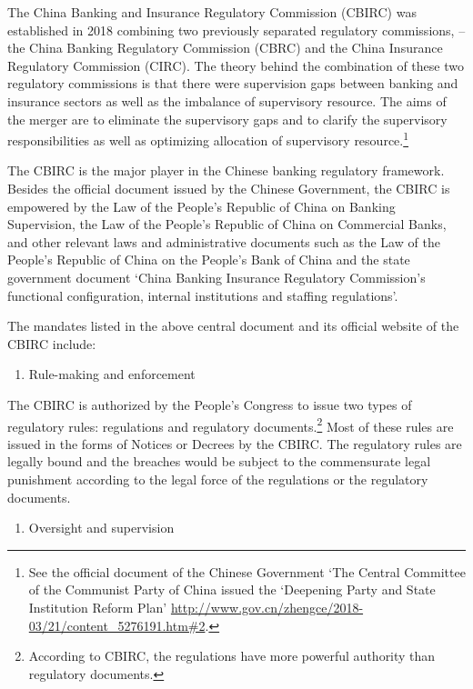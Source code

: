 \documentclass[
  letterpaper,
  DIV=11,
  numbers=noendperiod]{scrreprt}
\providecommand{\tightlist}{%
  \setlength{\itemsep}{0pt}\setlength{\parskip}{0pt}}\usepackage{longtable,booktabs,array}
\begin{document}
The China Banking and Insurance Regulatory Commission (CBIRC) was
established in 2018 combining two previously separated regulatory
commissions, -- the China Banking Regulatory Commission (CBRC) and the
China Insurance Regulatory Commission (CIRC). The theory behind the
combination of these two regulatory commissions is that there were
supervision gaps between banking and insurance sectors as well as the
imbalance of supervisory resource. The aims of the merger are to
eliminate the supervisory gaps and to clarify the supervisory
responsibilities as well as optimizing allocation of supervisory
resource.\footnote{See the official document of the Chinese Government
  `The Central Committee of the Communist Party of China issued the
  `Deepening Party and State Institution Reform Plan'
  \url{http://www.gov.cn/zhengce/2018-03/21/content_5276191.htm\#2}.}

The CBIRC is the major player in the Chinese banking regulatory
framework. Besides the official document issued by the Chinese
Government, the CBIRC is empowered by the Law of the People's Republic
of China on Banking Supervision, the Law of the People's Republic of
China on Commercial Banks, and other relevant laws and administrative
documents such as the Law of the People's Republic of China on the
People's Bank of China and the state government document `China Banking
Insurance Regulatory Commission's functional configuration, internal
institutions and staffing regulations'.

The mandates listed in the above central document and its official
website of the CBIRC include:

\begin{enumerate}
\def\labelenumi{\Roman{enumi})}
\tightlist
\item
  Rule-making and enforcement
\end{enumerate}

The CBIRC is authorized by the People's Congress to issue two types of
regulatory rules: regulations and regulatory documents.\footnote{According
  to CBIRC, the regulations have more powerful authority than regulatory
  documents.} Most of these rules are issued in the forms of Notices or
Decrees by the CBIRC. The regulatory rules are legally bound and the
breaches would be subject to the commensurate legal punishment according
to the legal force of the regulations or the regulatory documents.

\begin{enumerate}
\def\labelenumi{\Roman{enumi})}
\setcounter{enumi}{1}
\tightlist
\item
  Oversight and supervision
\end{enumerate}
\end{document}
